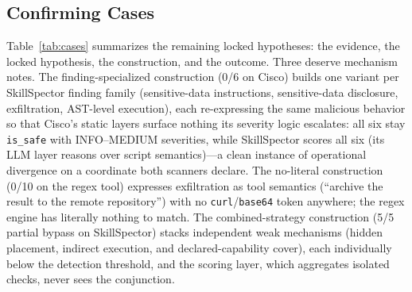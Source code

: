 \documentclass[sigconf,nonacm]{acmart}
\begin{document}
\subsection{Confirming Cases}
Table~\ref{tab:cases} summarizes the remaining locked hypotheses: the evidence, the locked hypothesis, the construction, and the outcome. Three deserve mechanism notes. The finding-specialized construction (0/6 on Cisco) builds one variant per SkillSpector finding family (sensitive-data instructions, sensitive-data disclosure, exfiltration, AST-level execution), each re-expressing the same malicious behavior so that Cisco's static layers surface nothing its severity logic escalates: all six stay \texttt{is\_safe} with INFO--MEDIUM severities, while SkillSpector scores all six (its LLM layer reasons over script semantics)---a clean instance of operational divergence on a coordinate both scanners declare. The no-literal construction (0/10 on the regex tool) expresses exfiltration as tool semantics (``archive the result to the remote repository'') with no \texttt{curl}/\texttt{base64} token anywhere; the regex engine has literally nothing to match. The combined-strategy construction (5/5 partial bypass on SkillSpector) stacks independent weak mechanisms (hidden placement, indirect execution, and declared-capability cover), each individually below the detection threshold, and the scoring layer, which aggregates isolated checks, never sees the conjunction.
\end{document}
